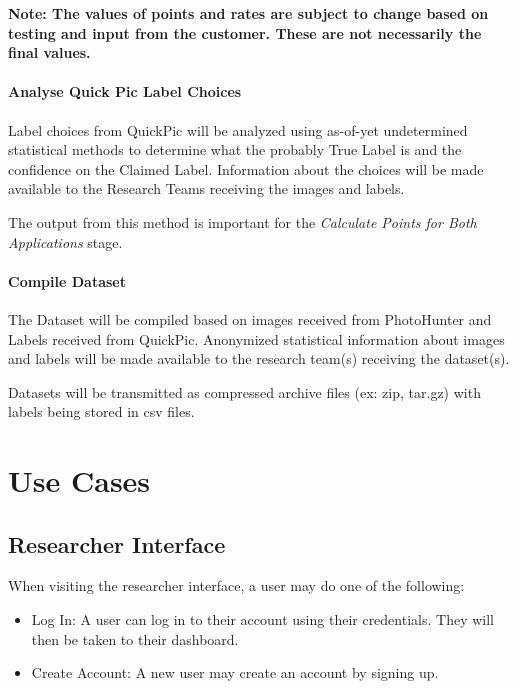 \documentclass{article}
\begin{document}
\textbf{Note: The values of points and rates are subject to change based on
  testing and input from the customer.  These are not necessarily the final
  values.}

\paragraph{Analyse Quick Pic Label Choices}

Label choices from QuickPic will be analyzed using as-of-yet undetermined
statistical methods to determine what the probably True Label is and the
confidence on the Claimed Label.  Information about the choices will be made
available to the Research Teams receiving the images and labels.

The output from this method is important for the \textit{Calculate Points for
  Both Applications} stage.

\paragraph{Compile Dataset}

The Dataset will be compiled based on images received from PhotoHunter and
Labels received from QuickPic.  Anonymized statistical information about images
and labels will be made available to the research team(s) receiving the
dataset(s).

Datasets will be transmitted as compressed archive files (ex: zip, tar.gz) with
labels being stored in csv files.

\section{Use Cases}
\subsection{Researcher Interface}
When visiting the researcher interface, a user may do one of the following:
\begin{itemize}
\item Log In: A user can log in to their account using their credentials. They will then be taken to their dashboard.
\item Create Account: A new user may create an account by signing up.
\end{itemize}
\end{document}
